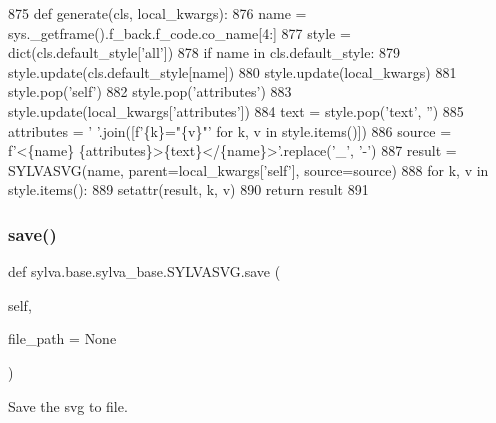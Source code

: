 \begin{DoxyCode}
875     \textcolor{keyword}{def }generate(cls, local\_kwargs):
876         name = sys.\_getframe().f\_back.f\_code.co\_name[4:]
877         style = dict(cls.default\_style[\textcolor{stringliteral}{'all'}])
878         \textcolor{keywordflow}{if} name \textcolor{keywordflow}{in} cls.default\_style:
879             style.update(cls.default\_style[name])
880         style.update(local\_kwargs)
881         style.pop(\textcolor{stringliteral}{'self'})
882         style.pop(\textcolor{stringliteral}{'attributes'})
883         style.update(local\_kwargs[\textcolor{stringliteral}{'attributes'}])
884         text = style.pop(\textcolor{stringliteral}{'text'}, \textcolor{stringliteral}{''})
885         attributes = \textcolor{stringliteral}{' '}.join([f\textcolor{stringliteral}{'\{k\}="\{v\}"'} \textcolor{keywordflow}{for} k, v \textcolor{keywordflow}{in} style.items()])
886         source = f\textcolor{stringliteral}{'<\{name\} \{attributes\}>\{text\}</\{name\}>'}.replace(\textcolor{stringliteral}{'\_'}, \textcolor{stringliteral}{'-'})
887         result = SYLVASVG(name, parent=local\_kwargs[\textcolor{stringliteral}{'self'}], source=source)
888         \textcolor{keywordflow}{for} k, v \textcolor{keywordflow}{in} style.items():
889             setattr(result, k, v)
890         \textcolor{keywordflow}{return} result
891 
\end{DoxyCode}
\mbox{\label{classsylva_1_1base_1_1sylva__base_1_1_s_y_l_v_a_s_v_g_adc94584453d3c0bff2d798c0ae70ea24}} 
\subsubsection{\texorpdfstring{save()}{save()}}
{\footnotesize\ttfamily def sylva.\+base.\+sylva\+\_\+base.\+S\+Y\+L\+V\+A\+S\+V\+G.\+save (\begin{DoxyParamCaption}\item[{}]{self,  }\item[{}]{file\+\_\+path = {\ttfamily None} }\end{DoxyParamCaption})}



Save the svg to file. 


